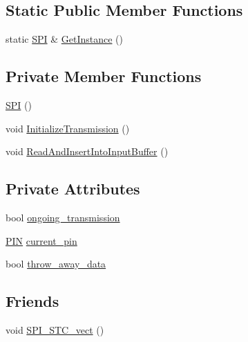 \subsection*{Static Public Member Functions}
\begin{DoxyCompactItemize}
\item 
static \hyperlink{class_s_p_i___n_1_1_s_p_i}{S\+PI} \& \hyperlink{class_s_p_i___n_1_1_s_p_i_abc266ff9d817b8d4437d1da47fe8e7ae}{Get\+Instance} ()
\end{DoxyCompactItemize}
\subsection*{Private Member Functions}
\begin{DoxyCompactItemize}
\item 
\hyperlink{class_s_p_i___n_1_1_s_p_i_a8fec1a6e642a5758acf974b92e28a9e6}{S\+PI} ()
\item 
void \hyperlink{class_s_p_i___n_1_1_s_p_i_af973a5b4a970c3c01430037d578151ef}{Initialize\+Transmission} ()
\item 
void \hyperlink{class_s_p_i___n_1_1_s_p_i_a5f2091bd02e8adbe6814b12fb6e2057f}{Read\+And\+Insert\+Into\+Input\+Buffer} ()
\end{DoxyCompactItemize}
\subsection*{Private Attributes}
\begin{DoxyCompactItemize}
\item 
bool \hyperlink{class_s_p_i___n_1_1_s_p_i_aff61d4bfc6a6e0088c3653898b1e91b8}{ongoing\+\_\+transmission}
\item 
\hyperlink{struct_s_p_i___n_1_1_p_i_n}{P\+IN} \hyperlink{class_s_p_i___n_1_1_s_p_i_ac016c4eaed2db3f8b5523bf0d472ddd2}{current\+\_\+pin}
\item 
bool \hyperlink{class_s_p_i___n_1_1_s_p_i_a7b2d300478662920e6911cea751e1094}{throw\+\_\+away\+\_\+data}
\end{DoxyCompactItemize}
\subsection*{Friends}
\begin{DoxyCompactItemize}
\item 
void \hyperlink{class_s_p_i___n_1_1_s_p_i_a96543550133e0b0c6ae83faad5c0d68d}{S\+P\+I\+\_\+\+S\+T\+C\+\_\+vect} ()
\end{DoxyCompactItemize}


